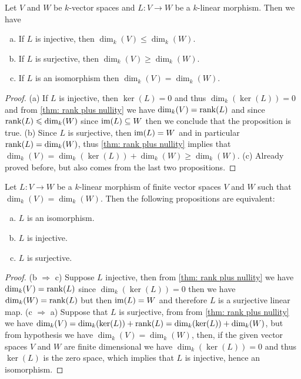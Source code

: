 \begin{corollary}
  Let \(V\) and \(W\) be \(k\)-vector spaces and \(L : V \to W\) be a
  \(k\)-linear morphism. Then we have
  \begin{enumerate}[(a).]
    \item If \(L\) is injective, then \(\dim_k(V) \leq \dim_k(W)\).
    \item If \(L\) is surjective, then \(\dim_k(V) \geq \dim_k(W)\).
    \item If \(L\) is an isomorphism then \(\dim_k(V) = \dim_k(W)\).
  \end{enumerate}
\end{corollary}

\begin{proof}
  (a) If \(L\) is injective, then \(\ker(L) = 0\) and thus \(\dim_k(\ker(L)) =
  0\) and from \cref{thm: rank plus nullity} we have \(\dim_k(V) = \operatorname{rank}(L)\) and
  since \(\operatorname{rank}(L) \leqslant \dim_k(W)\) since \(\operatorname{im}(L) \subseteq W\) then we
  conclude that the proposition is true. (b) Since \(L\) is surjective, then
  \(\operatorname{im}(L) = W\) and in particular \(\operatorname{rank}(L) = \dim_k(W)\), thus \cref{thm: rank
  plus nullity} implies that  \(\dim_k(V) = \dim_k(\ker(L)) + \dim_k(W) \geq
  \dim_k(W)\). (c) Already proved before, but also comes from the last two
  propositions.
\end{proof}

\begin{corollary}\label{cor: equal dim - iso conditions}
  Let \(L : V \to W\) be a \(k\)-linear morphism of finite vector spaces \(V\)
  and \(W\) such that \(\dim_k(V) = \dim_k(W)\). Then the following propositions
  are equivalent:
  \begin{enumerate}[(a).]
    \item \(L\) is an isomorphism.
    \item \(L\) is injective.
    \item \(L\) is surjective.
  \end{enumerate}
\end{corollary}

\begin{proof}
  (b \(\Rightarrow\) c) Suppose \(L\) injective, then from \cref{thm: rank plus
  nullity} we have \(\dim_k(V) = \operatorname{rank}(L)\) since \(\dim_k(\ker(L)) = 0\) then
  we have \(\dim_k(W) = \operatorname{rank}(L)\) but then \(\operatorname{im}(L) = W\) and therefore \(L\)
  is a surjective linear map. (c \(\Rightarrow\) a) Suppose that \(L\) is
  surjective, from from \cref{thm: rank plus nullity} we have \(\dim_k(V) =
  \dim_k(\ker(L)) + \operatorname{rank}(L) = \dim_k(\ker(L)) + \dim_k(W)\), but from
  hypothesis we have \(\dim_k(V) = \dim_k(W)\), then, if the given vector spaces
  \(V\) and \(W\) are finite dimensional we have \(\dim_k(\ker(L)) = 0\) and
  thus \(\ker(L)\) is the zero space, which implies that \(L\) is injective,
  hence an isomorphism.
\end{proof}

